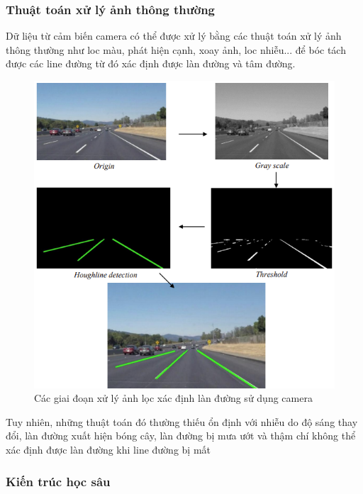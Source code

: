 \subsubsection{Thuật toán xử lý ảnh thông thường}
Dữ liệu từ cảm biến camera có thể được xử lý bằng các thuật toán xử lý ảnh thông thường như loc màu, phát hiện cạnh, xoay ảnh, loc nhiễu... để bóc tách được các line đường từ đó xác định được làn đường và tâm đường.
\newpage
\begin{figure}[!hbt]
\begin{center}
    \includegraphics[width=14cm]{img/4_Implement/opencv_stages.png}
    \caption{Các giai đoạn xử lý ảnh lọc xác định làn đường sử dụng camera}
\end{center}
\end{figure}
Tuy nhiên, những thuật toán đó thường thiếu ổn định với nhiễu do độ sáng thay đổi, làn đường xuất hiện bóng cây, làn đường bị mưa ướt và thậm chí không thể xác định được làn đường khi line đường bị mất
\subsubsection{Kiến trúc học sâu}
